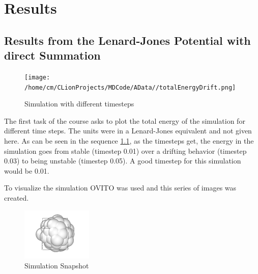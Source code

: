 \chapter{Results}

\section{Results from the Lenard-Jones Potential with direct Summation}

\begin{figure}
	\begin{center}
		\texttt{[image: /home/cm/CLionProjects/MDCode/AData//totalEnergyDrift.png]}
	\end{center}
	\caption[Simulation with different timesteps]{Simulation with different timesteps}
	\label{SimWithTimestep}
\end{figure}
The first task of the course asks to plot the total energy of the simulation for different time steps. The units were in a Lenard-Jones equivalent and not given here. As can be seen in the sequence \ref{SimWithTimestep}, as the timesteps get, the energy in the simulation goes from stable (timestep 0.01) over a drifting behavior (timestep 0.03) to being unstable (timestep 0.05). A good timestep for this simulation would be 0.01.  
\par
To visualize the simulation OVITO \cite{ovito} was used and this series of images was created.
\begin{figure}
	\begin{center}
		\includegraphics[scale= 0.65]{Figure/1ImageS.png}
	\end{center}
	\caption[Simulation Snapshot]{Simulation Snapshot}
	\label{SimulationSnapshot1}
\end{figure}

